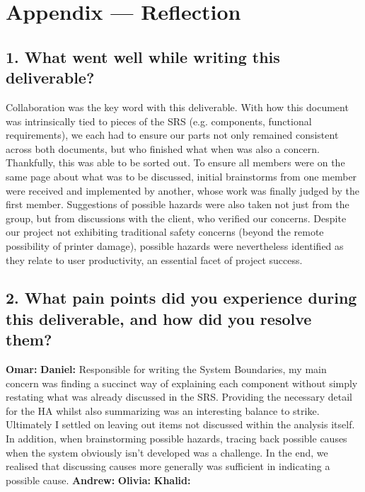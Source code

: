 \documentclass{article}
\begin{document}
\section*{Appendix --- Reflection}

\iffalse
\wss{Not required for CAS 741}
\fi



\subsection*{1. What went well while writing this deliverable?} 
Collaboration was the key word with this deliverable. With how this document was intrinsically tied 
to pieces of the SRS (e.g. components, functional requirements), we each had to ensure our parts not only 
remained consistent across both documents, but who finished what when was also a concern. Thankfully, 
this was able to be sorted out. To ensure all members were on the same page about what was to be discussed, 
initial brainstorms from one member were received and implemented by another, whose work was finally 
judged by the first member. Suggestions of possible hazards were also taken not just from the group, but 
from discussions with the client, who verified our concerns. Despite our project not exhibiting traditional 
safety concerns (beyond the remote possibility of printer damage), possible hazards were nevertheless 
identified as they relate to user productivity, an essential facet of project success.

\subsection*{2. What pain points did you experience during this deliverable, and how
did you resolve them?}
\bigskip
\textbf{Omar: }
\newline
\newline
\textbf{Daniel: } Responsible for writing the System Boundaries, my main concern was finding a succinct way of explaining each component without simply restating what was already discussed in the SRS. Providing the necessary detail for the HA whilst also summarizing was an interesting balance to strike. Ultimately I settled on leaving out items not discussed within the analysis itself. In addition, when brainstorming possible hazards, tracing back possible causes when the system obviously isn't developed was a challenge. In the end, we realised that discussing causes more generally was sufficient in indicating a possible cause.
\newline
\newline
\textbf{Andrew: }
\newline
\newline
\textbf{Olivia: }
\newline
\newline
\textbf{Khalid: }
\end{document}
